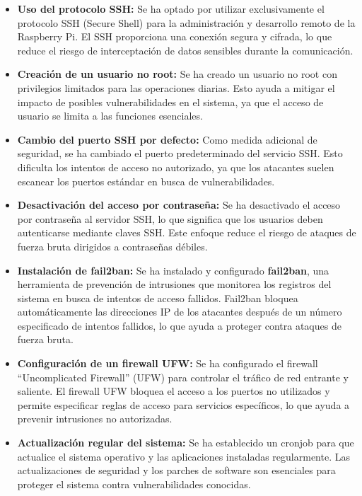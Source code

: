 \begin{itemize}
    \item \textbf{Uso del protocolo SSH:} Se ha optado por utilizar exclusivamente el protocolo SSH (Secure Shell) para la administración y desarrollo remoto de la Raspberry Pi. El SSH proporciona una conexión segura y cifrada, lo que reduce el riesgo de interceptación de datos sensibles durante la comunicación.
    
    \item \textbf{Creación de un usuario no root:} Se ha creado un usuario no root con privilegios limitados para las operaciones diarias. Esto ayuda a mitigar el impacto de posibles vulnerabilidades en el sistema, ya que el acceso de usuario se limita a las funciones esenciales.
    
    \item \textbf{Cambio del puerto SSH por defecto:} Como medida adicional de seguridad, se ha cambiado el puerto predeterminado del servicio SSH. Esto dificulta los intentos de acceso no autorizado, ya que los atacantes suelen escanear los puertos estándar en busca de vulnerabilidades.
    
    \item \textbf{Desactivación del acceso por contraseña:} Se ha desactivado el acceso por contraseña al servidor SSH, lo que significa que los usuarios deben autenticarse mediante claves SSH. Este enfoque reduce el riesgo de ataques de fuerza bruta dirigidos a contraseñas débiles.
    
    \item \textbf{Instalación de fail2ban:} Se ha instalado y configurado \textbf{fail2ban}, una herramienta de prevención de intrusiones que monitorea los registros del sistema en busca de intentos de acceso fallidos. Fail2ban bloquea automáticamente las direcciones IP de los atacantes después de un número especificado de intentos fallidos, lo que ayuda a proteger contra ataques de fuerza bruta.
    
    \item \textbf{Configuración de un firewall UFW:} Se ha configurado el firewall ``Uncomplicated Firewall'' (UFW) para controlar el tráfico de red entrante y saliente. El firewall UFW bloquea el acceso a los puertos no utilizados y permite especificar reglas de acceso para servicios específicos, lo que ayuda a prevenir intrusiones no autorizadas.
    
	\item \textbf{Actualización regular del sistema:} Se ha establecido un cronjob para que actualice el sistema operativo y las aplicaciones instaladas regularmente. Las actualizaciones de seguridad y los parches de software son esenciales para proteger el sistema contra vulnerabilidades conocidas.
\end{itemize}

